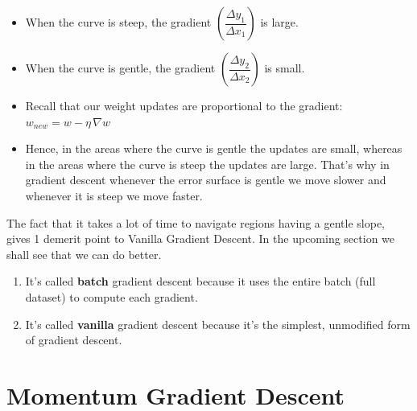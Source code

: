 \documentclass[11pt, a4paper]{article}
\begin{document}
\begin{itemize}
    \item When the curve is steep, the gradient $\left( \dfrac{\Delta y_1}{\Delta x_1} \right)$ is large.
    
    \item When the curve is gentle, the gradient $\left( \dfrac{\Delta y_2}{\Delta x_2} \right)$ is small.
    
    \item Recall that our weight updates are proportional to the gradient: $w_{new} = w - \eta \, \nabla w$
    
    \item Hence, in the areas where the curve is gentle the updates are small, whereas in the areas where the curve is steep the updates are large. That's why in gradient descent whenever the error surface is gentle we move slower and whenever it is steep we move faster.
\end{itemize}

The fact that it takes a lot of time to navigate regions having a gentle slope, gives 1 demerit point to Vanilla Gradient Descent. In the upcoming section we shall see that we can do better.


\begin{enumerate}
\item It’s called \textbf{batch} gradient descent because it uses the entire batch (full dataset) to compute each gradient.

\item It’s called \textbf{vanilla} gradient descent because it’s the simplest, unmodified form of gradient descent.
\end{enumerate}

\newpage

\section{Momentum Gradient Descent}
\end{document}
